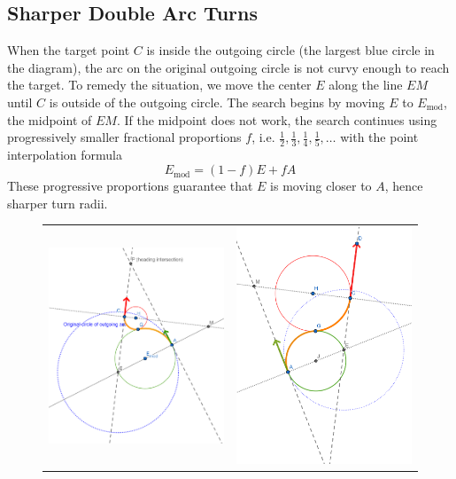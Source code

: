 \documentclass{article}
\begin{document}
\subsection*{Sharper Double Arc Turns}

When the target point $C$ is inside the outgoing circle (the largest blue circle in the diagram), the arc on the 
original outgoing circle is not curvy enough to reach the target. To remedy the situation, we move the center $E$
along the line $EM$ until $C$ is outside of the outgoing circle. The search begins by moving $E$ to $E_\text{mod}$, 
the midpoint of $EM$. If the midpoint does not work, the search continues using progressively smaller fractional proportions 
$f$, i.e. $\frac12, \frac13, \frac14, \frac15, \ldots$ with the point interpolation formula $$E_\text{mod} = (1-f)E + fA$$
These progressive proportions guarantee that $E$ is moving closer to $A$, hence sharper turn radii.

\begin{figure}[hbt]
  \begin{tabular}{c|c}
\includegraphics[width=6cm]{screenshots/DoubleArcModCenter.png} &
\includegraphics[width=6cm]{screenshots/DoubleArcModCenterDiverging.png}
\end{tabular}
\end{figure}
\end{document}
